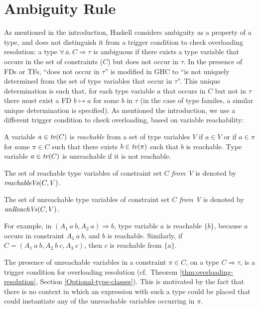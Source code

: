 \section{Ambiguity Rule}
\label{sec:ambiguity}

As mentioned in the introduction, Haskell considers ambiguity as a
property of a type, and does not distinguish it from a trigger
condition to check overloading resolution: a type
$\forall\,\overline{a}.\,C \Rightarrow \tau$ is ambiguous if there
exists a type variable that occurs in the set of constraints ($C$) but
does not occur in $\tau$.  In the presence of FDs or TFs, ``does not
occur in $\tau$'' is modified in GHC \cite{GHC} to ``is not uniquely
determined from the set of type variables that occur in $\tau$''. This
unique determination is such that, for each type variable $a$ that
occurs in $C$ but not in $\tau$ there must exist a FD $b \mapsto a$
for some $b$ in $\tau$ (in the case of type familes, a similar unique
determination is specified). As mentioned the introduction, we use a
different trigger condition to check overloading, based on variable
reachability:

\begin{Definition}

A variable $a\in {\it tv\/}(C)$ is {\em reachable} from a set of type
variables $V$ if $a\in V$ or if $a\in \pi$ for some $\pi\in C$ such
that there exists $b\in {\it tv\/}(\pi)$ such that $b$ is reachable. Type
variable $a\in {\it tv\/}(C)$ is unreachable if it is not reachable.

The set of reachable type variables of constraint set $C$ {\em from
  V\/} is denoted by ${\it reachableVs\/}(C,V)$.

The set of unreachable type variables of constraint set $C$ {\em from
  V\/} is denoted by $\text{\it unReachVs\/}(C,V)$.

\label{def:reachable}
\end{Definition}

For example, in $(A_1\: a\: b, A_2\: a) \Rightarrow b$, type variable
$a$ is reachable $\{b\}$, because $a$ occurs in constraint $A_1\: a\:
b$, and $b$ is reachable. Similarly, if $C = (A_1\: a\: b, A_2\: b\:
c, A_3\: c)$, then $c$ is reachable from $\{a\}$.

The presence of unreachable variables in a constraint $\pi\in C$, on a
type $C \Rightarrow \tau$, is a trigger condition for overloading
resolution (cf.~Theorem \ref{thm:overloading-resolution}, Section
\ref{Optional-type-classes}). This is motivated by the fact that there
is no context in which an expression with such a type could be placed
that could instantiate any of the unreachable variables occurring in
$\pi$.

